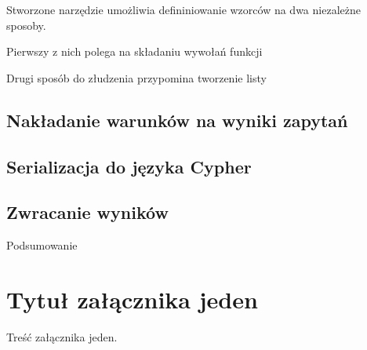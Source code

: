 \documentclass[brudnopis]{xmgr}
\begin{document}
Stworzone narzędzie umożliwia defininiowanie wzorców na dwa niezależne sposoby.

Pierwszy z nich polega na składaniu wywołań funkcji

Drugi sposób do złudzenia przypomina tworzenie listy 

\section{Nakładanie warunków na wyniki zapytań}

\section{Serializacja do języka Cypher}

\section{Zwracanie wyników}

\summary
Podsumowanie

\appendix
\chapter{Tytuł załącznika jeden}

Treść załącznika jeden.




\listoftables

\listoffigures

\oswiadczenie
\end{document}
